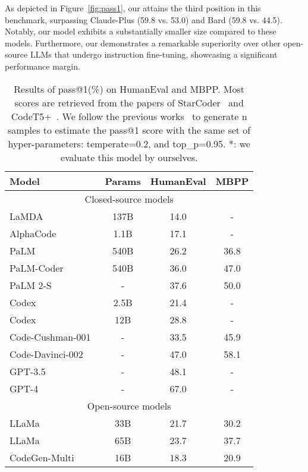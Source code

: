 As depicted in Figure~\ref{fig:pass1}, our \modelname{} attains the third position in this benchmark, surpassing Claude-Plus (59.8 vs. 53.0) and Bard (59.8 vs. 44.5). Notably, our model exhibits a substantially smaller size compared to these models. Furthermore, our \modelname{} demonstrates a remarkable superiority over other open-source LLMs that undergo instruction fine-tuning, showcasing a significant performance margin.

\begin{table}
    \centering
    \caption{Results of pass@1(\%) on HumanEval and MBPP. Most scores are retrieved from the papers of StarCoder~\cite{li2023starcoder} and CodeT5+~\cite{CodeT5+}. We follow the previous works~\cite{humeval} to generate n samples to estimate the pass@1 score with the same set of hyper-parameters: temperate=0.2, and top\_p=0.95. *: we evaluate this model by ourselves.}
    \begin{tabular}{lccc}
        \toprule
        \textbf{Model} & \textbf{Params} & \textbf{HumanEval} & \textbf{MBPP} \\
        \midrule
        \multicolumn{4}{c}{Closed-source models}\\
        \midrule
        LaMDA~\cite{LaMDA} & 137B & 14.0 & -\\
        AlphaCode~\cite{AlphaCode} & 1.1B & 17.1 & -\\
        PaLM~\cite{PaLM} & 540B & 26.2 & 36.8\\
        PaLM-Coder~\cite{PaLM} & 540B & 36.0 & 47.0\\
        PaLM 2-S~\cite{palm2} & - & 37.6 & 50.0\\
        Codex~\cite{codex} & 2.5B & 21.4 & -\\
        Codex~\cite{codex} & 12B & 28.8 & -\\
        Code-Cushman-001~\cite{Azure} & - & 33.5 & 45.9\\
        Code-Davinci-002~\cite{Azure} & - & 47.0 & 58.1\\
        GPT-3.5~\cite{GPT4} & - & 48.1 & -\\
        GPT-4~\cite{GPT4} & - & 67.0 & -\\
        \midrule
        \multicolumn{4}{c}{Open-source models}\\
        \midrule
        LLaMa~\cite{llama} & 33B & 21.7 & 30.2\\
        LLaMa~\cite{llama} & 65B & 23.7 & 37.7\\
        CodeGen-Multi~\cite{codegen} & 16B & 18.3 & 20.9\\

\end{tabular}
\end{table}

